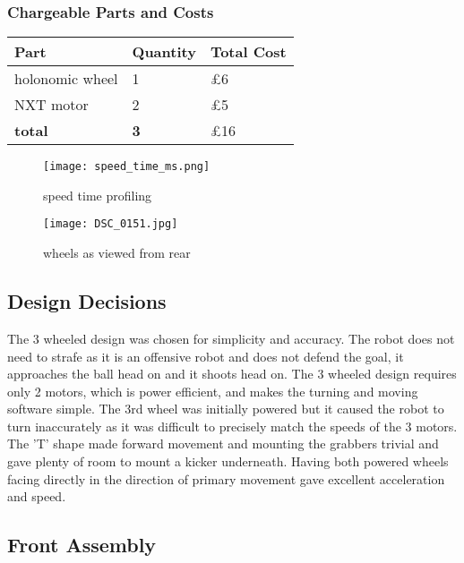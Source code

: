 \subsubsection{Chargeable Parts and Costs}
\begin{center}
\begin{tabular}{ | m{3cm} | m{3cm}| m{6cm} | }
\hline
\textbf{Part} & \textbf{Quantity} & \textbf{Total Cost} \\
\hline
holonomic wheel & 1 & £6 \\
\hline
NXT motor       & 2 & £5 \\
\hline
\textbf{total} & \textbf{3} & £16 \\
\hline
\end{tabular}
\end{center}


\begin{figure}[!ht]
\caption{speed time profiling}
\centering
\texttt{[image: speed\_time\_ms.png]}
\end{figure}
\begin{figure}[!ht]
\caption{wheels as viewed from rear}
\centering
\texttt{[image: DSC\_0151.jpg]}
\end{figure}

\subsection{Design Decisions}
The 3 wheeled design was chosen for simplicity and accuracy. The robot does not need to strafe as it is an offensive robot and does not defend the goal, it approaches the ball head on and it shoots head on. The 3 wheeled design requires only 2 motors, which is power efficient, and makes the turning and moving software simple. The 3rd wheel was initially powered but it caused the robot to turn inaccurately as it was difficult to precisely match the speeds of the 3 motors. The 'T' shape made forward movement and mounting the grabbers trivial and gave plenty of room to mount a kicker underneath. Having both powered wheels facing directly in the direction of primary movement gave excellent acceleration and speed.

\subsection{Front Assembly}
